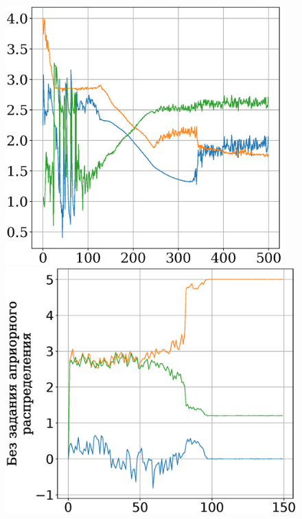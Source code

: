\documentclass[12pt, twoside]{article}
\numberwithin{equation}{section}
\begin{document}
\begin{figure}[h]
\begin{minipage}{.32\textwidth}
\end{minipage}
\begin{minipage}{.32\textwidth}
\vspace{2pt}
\hspace{-6.3mm}
      \includegraphics[width = 0.95\textwidth]{figures/912noise.eps}
\end{minipage}
\begin{minipage}{.32\textwidth}
\hspace{-3mm}
      \includegraphics[width = 1.05\textwidth]{figures/900noise.eps}

\end{minipage}
\end{figure}
\end{document}
